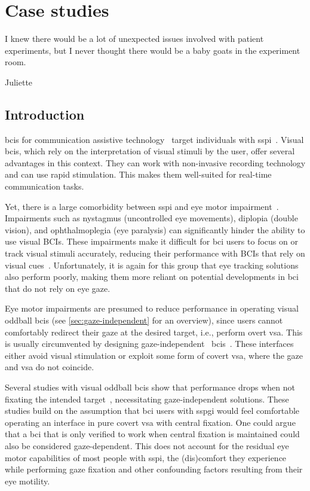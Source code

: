 \chapter{Case studies}
\label{sec:patients}
\epigraph{I knew there would be a lot of unexpected issues involved with
patient experiments, but I never thought there would be a baby
goats in the experiment room.}{Juliette}

\section{Introduction}

\Acp{bci} for communication assistive technology~\cite{Millan2010}
target individuals with \acf{sspi}~\cite{Peters2022}.
Visual \acp{bci}, which rely on the interpretation of visual stimuli by the user,
offer several advantages in this context.
They can work with non-invasive recording technology and can use rapid
stimulation.
This makes them well-suited for real-time communication tasks.

Yet, there is a large comorbidity between \ac{sspi} and eye motor impairment~\cite{FriedOken2020}.
Impairments such as nystagmus (uncontrolled eye movements), diplopia (double
vision), and ophthalmoplegia (eye paralysis) can significantly hinder
the ability to use visual BCIs. These impairments make it difficult for
\ac{bci} users to focus on or track visual stimuli accurately, reducing their
performance with BCIs that rely on visual cues~\cite{McCane2014,FriedOken2020,Pasqualotto2015}.
Unfortunately, it is again for this group that eye tracking solutions also
perform poorly, making them more reliant on potential developments in \ac{bci}
that do not rely on eye gaze.

Eye motor impairments are presumed to reduce performance in operating visual
oddball \ac{bci}s (see \cref{sec:gaze-independent} for an overview), since users
cannot comfortably redirect their gaze at the desired target,
i.e., perform overt \ac{vsa}.
This is usually circumvented by designing gaze-independent~
\acp{bci}~\cite{Riccio2012}.
These interfaces either avoid visual stimulation or exploit some form of
covert \ac{vsa}, where the gaze and \ac{vsa} do not coincide.

Several studies with visual oddball \acp{bci} show that performance drops when not fixating the intended
target~\cite{Brunner2010, Treder2010, RonAngevin2019}, necessitating
gaze-independent solutions.
These studies build on the assumption that \ac{bci} users with \ac{sspgi}
would feel comfortable operating an interface in pure covert \ac{vsa} with
central fixation.
One could argue that a \ac{bci} that is only verified to work when central
fixation is maintained could also be considered gaze-dependent.
This does not account for the residual eye motor capabilities of most people
with \ac{sspi}, the (dis)comfort they experience while
performing gaze fixation and other confounding factors resulting from their eye
motility.

